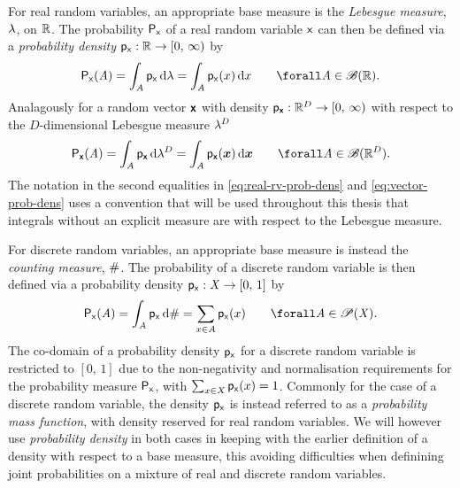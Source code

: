 For real random variables, an appropriate base measure is the \emph{Lebesgue measure}, $\lebm{1}$, on $\mathbb{R}$. The probability $\mathsf{P}_{\mathsf{x}}$ of a real random variable $\mathsf{x}$ can then be defined via a \emph{probability density} $\mathsf{p}_{\mathsf{x}} : \mathbb{R} \to [0,\,\infty)$ by
\begin{equation}\label{eq:real-rv-prob-dens}
    \prob{\rvar{x}}(\set{A})
    = \int_{\set{A}} \pden{\rvar{x}} \,\dr\lebm{1}
    = \int_{\set{A}} \pden{\rvar{x}}(x) \,\dr x
    \qquad
    \forall \set{A} \in \borel(\reals).
\end{equation}
Analagously for a random vector $\boldsymbol{\mathsf{x}}$ with density $\mathsf{p}_{\boldsymbol{\mathsf{x}}} : \mathbb{R}^D \to [0,\,\infty)$ with respect to the $D$-dimensional Lebesgue measure $\lebm{D}$
\begin{equation}\label{eq:vector-prob-dens}
    \prob{\rvct{x}}(\set{A})
    = \int_{\set{A}} \pden{\rvct{x}} \,\dr\lebm{D}
    = \int_{\set{A}} \pden{\rvct{x}}(\vct{x}) \,\dr \vct{x}
    \qquad
    \forall \set{A} \in \borel(\reals^D).
\end{equation}
The notation in the second equalities in \eqref{eq:real-rv-prob-dens} and \eqref{eq:vector-prob-dens} uses a convention that will be used throughout this thesis that integrals without an explicit measure are with respect to the Lebesgue measure. 

For discrete random variables, an appropriate base measure is instead \pagebreak the \emph{counting measure}, $\#$. The probability of a discrete random variable is then defined via a probability density $\mathsf{p}_{\mathsf{x}} : \mathit{X} \to [0,\,1]$ by
\begin{equation}
    \prob{\rvar{x}}(\set{A})
    = \int_{\set{A}} \pden{\rvar{x}} \,\dr\countm
    = \sum_{x \in \set{A}} \pden{\rvar{x}}(x) 
    \qquad
    \forall \set{A} \in \powerset(\set{X}).
\end{equation}
The co-domain of a probability density $\mathsf{p}_{\mathsf{x}}$ for a discrete random variable is restricted to $[0,\,1]$ due to the non-negativity and normalisation requirements for the probability measure $\mathsf{P}_{\mathsf{x}}$, with $\sum_{x\in\mathit{X}} \mathsf{p}_{\mathsf{x}}(x) = 1$. Commonly for the case of a discrete random variable, the density $\mathsf{p}_{\mathsf{x}}$ is instead referred to as a \emph{probability mass function}, with density reserved for real random variables. We will however use \emph{probability density} in both cases in keeping with the earlier definition of a density with respect to a base measure, this avoiding difficulties when definining joint probabilities on a mixture of real and discrete random variables.

